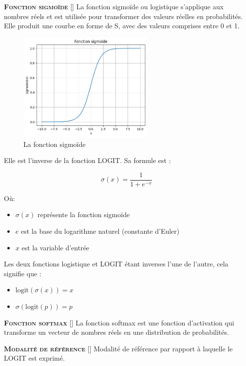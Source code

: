 \documentclass[10pt,french]{report}
\newcommand{\entreelex}[3][]{%
	{\large \textbf{\textsc{#2}}} %
	\if\relax\detokenize{#1}\relax %
	\else %
	\raisebox{0.15ex}{\scalebox{0.7}{$\Diamond$}} %
	[#1] %
	\fi
	\raisebox{0.13ex}{\scalebox{0.75}{$\blacksquare$}} #3 %
}
\begin{document}
	 \label{fonction sigmoïde}
	 \entreelex{Fonction sigmoïde}{La fonction sigmoïde ou logistique s'applique aux nombres réels et est utilisée pour transformer des valeurs réelles en probabilités. Elle produit une courbe en forme de S, avec des valeurs comprises entre 0 et 1.

	 \begin{figure}[h]
	 	\centering
	 	\includegraphics[width=0.6\textwidth]{f_sigmoide.png}
	 	\caption{La fonction sigmoïde}
	 	\label{fig:mesh1}
	 \end{figure}

	 Elle est l'inverse de la fonction LOGIT. Sa formule est :

 	\begin{equation}
 		\sigma(x) = \frac{1}{1 + e^{-x}}
 	\end{equation}

 	Où:
 	\begin{itemize}
 		\item $\sigma(x)$ représente la fonction sigmoïde
 		\item $e$ est la base du logarithme naturel (constante d'Euler)
 		\item $x$ est la variable d'entrée
 	\end{itemize}

 	Les deux fonctions logistique et LOGIT étant inverses l'une de l'autre, cela signifie que :
 	\begin{itemize}
 		\item $\text{logit}(\sigma(x)) = x$
 		\item $\sigma(\text{logit}(p)) = p$
	 \end{itemize}}

	 \label{fonction softmax}
	 \entreelex{Fonction softmax}{La fonction softmax est une fonction d'activation qui transforme un vecteur de nombres réels en une distribution de probabilités.}

	\entreelex{Modalité de référence}{Modalité de référence par rapport à laquelle le LOGIT est exprimé.}
\end{document}
